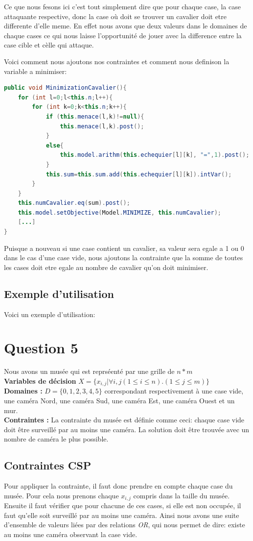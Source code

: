 \documentclass[a4paper,10pt]{article}
\begin{document}
Ce que nous fesons ici c'est tout simplement dire que pour chaque case, la case attaquante respective, donc la case où doit se trouver un cavalier doit etre differente d'elle meme. En effet nous avons que deux valeurs dans le domaines de chaque cases ce qui nous laisse l'opportunité de jouer avec la difference entre la case cible et cèlle qui attaque.

Voici comment nous ajoutons nos contraintes et comment nous definison la variable a minimiser:
\begin{lstlisting}[language=Java,basicstyle=\tiny]
public void MinimizationCavalier(){
	for (int l=0;l<this.n;l++){
		for (int k=0;k<this.n;k++){
			if (this.menace(l,k)!=null){
				this.menace(l,k).post();
			}
			else{
				this.model.arithm(this.echequier[l][k], "=",1).post();
			}
			this.sum=this.sum.add(this.echequier[l][k]).intVar();
		}	
	}
	this.numCavalier.eq(sum).post();
	this.model.setObjective(Model.MINIMIZE, this.numCavalier);
	[...]
}
\end{lstlisting}

Puisque a nouveau si une case contient un cavalier, sa valeur sera egale a 1 ou 0 dans le cas d'une case vide, nous ajoutons la contrainte que la somme de toutes les cases doit etre egale au nombre de cavalier qu'on doit minimiser.

\subsection{Exemple d'utilisation}
Voici un exemple d'utilisation:
\section{Question 5}
	Nous avons un musée qui est reprséenté par une grille de $n * m$\\
	\textbf {Variables de décision} $ X = \{x_{i,j} | \forall i,j (1 \leq i \leq n).(1 \leq j \leq m)\}$\\
	\textbf{Domaines : } $ D = \{0, 1, 2, 3, 4, 5\} $ correspondant respectivement à une case vide, une caméra Nord, une caméra Sud, une caméra Est, une caméra Ouest et un mur.\\
	\textbf{Contraintes : } La contrainte du musée est définie comme ceci: chaque case vide doit être surveillé par au moins une caméra. La solution doit être trouvée avec un nombre de caméra le plus possible.

	\subsection{Contraintes CSP}
		Pour appliquer la contrainte, il faut donc prendre en compte chaque case du musée.  Pour cela nous prenons chaque $x_{i,j}$ compris dans la taille du musée. Ensuite il faut vérifier que pour chacune de ces cases, si elle est non occupée, il faut qu'elle soit surveillé par au moins une caméra.  Ainsi nous avons une suite d'ensemble de valeurs liées par des relations \emph{OR}, qui nous permet de dire: existe au moins une caméra observant la case vide.
\end{document}
